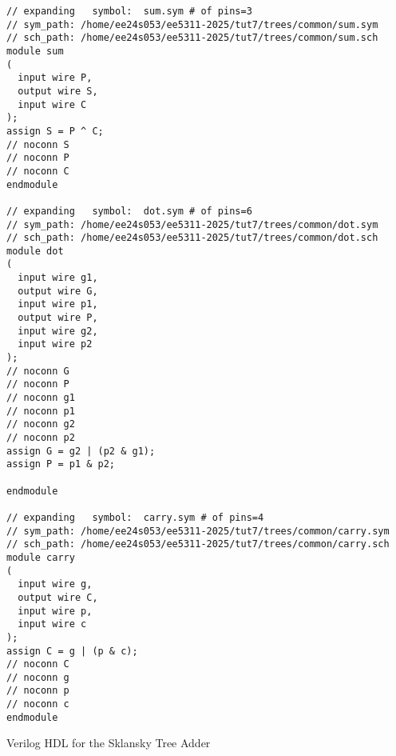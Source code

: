 \documentclass[10pt,a4paper]{article}
\begin{document}
\begin{verbatim}
// expanding   symbol:  sum.sym # of pins=3
// sym_path: /home/ee24s053/ee5311-2025/tut7/trees/common/sum.sym
// sch_path: /home/ee24s053/ee5311-2025/tut7/trees/common/sum.sch
module sum
(
  input wire P,
  output wire S,
  input wire C
);
assign S = P ^ C;
// noconn S
// noconn P
// noconn C
endmodule

// expanding   symbol:  dot.sym # of pins=6
// sym_path: /home/ee24s053/ee5311-2025/tut7/trees/common/dot.sym
// sch_path: /home/ee24s053/ee5311-2025/tut7/trees/common/dot.sch
module dot
(
  input wire g1,
  output wire G,
  input wire p1,
  output wire P,
  input wire g2,
  input wire p2
);
// noconn G
// noconn P
// noconn g1
// noconn p1
// noconn g2
// noconn p2
assign G = g2 | (p2 & g1);
assign P = p1 & p2;

endmodule

// expanding   symbol:  carry.sym # of pins=4
// sym_path: /home/ee24s053/ee5311-2025/tut7/trees/common/carry.sym
// sch_path: /home/ee24s053/ee5311-2025/tut7/trees/common/carry.sch
module carry
(
  input wire g,
  output wire C,
  input wire p,
  input wire c
);
assign C = g | (p & c);
// noconn C
// noconn g
// noconn p
// noconn c
endmodule
\end{verbatim}

\noindent Verilog HDL for the Sklansky Tree Adder
\end{document}
